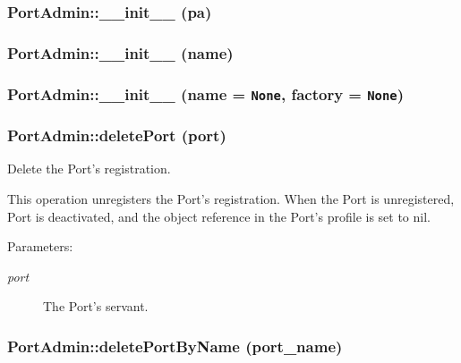 \subsubsection{\setlength{\rightskip}{0pt plus 5cm}Port\-Admin::\_\-\_\-init\_\-\_\- (pa)}\label{classPortAdmin_PortAdmina4}


\subsubsection{\setlength{\rightskip}{0pt plus 5cm}Port\-Admin::\_\-\_\-init\_\-\_\- (name)}\label{classPortAdmin_PortAdmina2}


\subsubsection{\setlength{\rightskip}{0pt plus 5cm}Port\-Admin::\_\-\_\-init\_\-\_\- (name = {\tt None}, factory = {\tt None})}\label{classPortAdmin_PortAdmina0}


\subsubsection{\setlength{\rightskip}{0pt plus 5cm}Port\-Admin::delete\-Port (port)}\label{classPortAdmin_PortAdmina11}


Delete the Port's registration. 

This operation unregisters the Port's registration. When the Port is unregistered, Port is deactivated, and the object reference in the Port's profile is set to nil. \begin{Desc}
\item[Parameters:]
\begin{description}
\item[{\em port}]The Port's servant.\end{description}
\end{Desc}
\subsubsection{\setlength{\rightskip}{0pt plus 5cm}Port\-Admin::delete\-Port\-By\-Name (port\_\-name)}\label{classPortAdmin_PortAdmina12}


